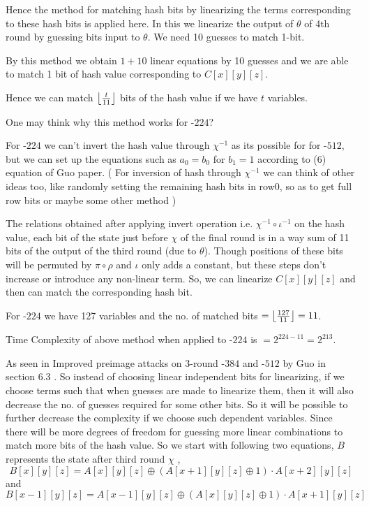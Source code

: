     Hence the method for matching hash bits by linearizing the terms corresponding to these hash bits is applied here.
    In this we linearize the output of $\theta$ of 4th round by guessing bits input to $\theta$. We need 10 guesses to match 1-bit.
    
    By this method we obtain $ 1 + 10 $ linear equations by 10 guesses and we are able to match 1 bit of hash value corresponding to $C[x][y][z]$.
    
    Hence we can match $\floor*{ \frac{t}{11} }$ bits of the hash value if we have $t$ variables.
    
    One may think why this method works for \KECCAK-$224$?
    
    For \KECCAK-$224$ we can't invert the hash value through $\chi^{-1}$ as its possible for for \KECCAK-$512$, but we can set up the equations such as $a_0 = b_0$ for $b_1 = 1$ according to (6) equation of Guo \etal paper. ( For inversion of hash through $\chi^{-1}$ we can think of other ideas too, like randomly setting the remaining hash bits in row0, so as to get full row bits or maybe some other method )
    
    The relations obtained after applying invert operation i.e. $\chi^{-1} \circ \iota^{-1}$ on the hash value, each bit of the state just before $\chi$ of the final round is in a way sum of 11 bits of the output of the third round (due to $\theta$). Though positions of these bits will be permuted by $\pi \circ \rho$ and $\iota$ only adds a constant, but these steps don't increase or introduce any non-linear term. So, we can linearize $C[x][y][z]$ and then can match the corresponding hash bit.
    
		For \KECCAK-$224$ we have 127 variables and the no. of matched bits $ = \floor*{ \frac{127}{11} } = 11 $.

    Time Complexity of above method when applied to \KECCAK-$224$ is $ = 2^{224 - 11} = 2^{213}$.
    
    As seen in Improved preimage attacks on 3-round \KECCAK-$384$ and \KECCAK-$512$ by Guo \etal in section 6.3 . So instead of choosing linear independent bits for linearizing, if we choose terms such that when guesses are made to linearize them, then it will also decrease the no. of guesses required for some other bits. So it will be possible to further decrease the complexity if we choose such dependent variables. Since there will be more degrees of freedom for guessing more linear combinations to match more bits of the hash value. So we start with following two equations, $B$ represents the state after third round $\chi$ ,
	\[
		B[x][y][z] = A[x][y][z] \oplus (A[x+1][y][z] \oplus 1) \cdot A[x+2][y][z]
	\] and
	\[
		B[x-1][y][z] = A[x-1][y][z] \oplus (A[x][y][z] \oplus 1) \cdot A[x+1][y][z]
	\]

